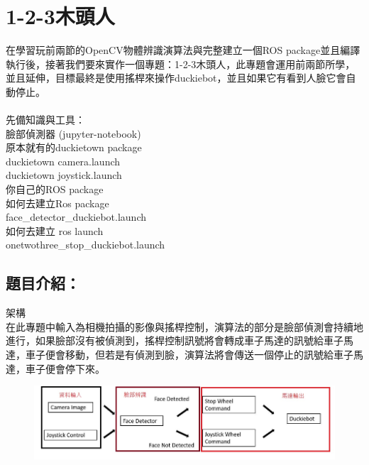\documentclass{article}
\begin{document}
\section{1-2-3木頭人}
在學習玩前兩節的OpenCV物體辨識演算法與完整建立一個ROS package並且編譯執行後，接著我們要來實作一個專題：1-2-3木頭人，此專題會運用前兩節所學，並且延伸，目標最終是使用搖桿來操作duckiebot，並且如果它有看到人臉它會自動停止。
\\\\先備知識與工具：
\\臉部偵測器 (jupyter-notebook)
\\原本就有的duckietown package
\\	duckietown camera.launch
\\	duckietown joystick.launch
\\你自己的ROS package
\\如何去建立Ros package 
\\	face\_detector\_duckiebot.launch
\\如何去建立 ros launch
\\	onetwothree\_stop\_duckiebot.launch
\subsection{題目介紹：}
架構
\\在此專題中輸入為相機拍攝的影像與搖桿控制，演算法的部分是臉部偵測會持續地進行，如果臉部沒有被偵測到，搖桿控制訊號將會轉成車子馬達的訊號給車子馬達，車子便會移動，但若是有偵測到臉，演算法將會傳送一個停止的訊號給車子馬達，車子便會停下來。
\begin{figure}[htp]
    \begin{center}
        \includegraphics[width=400pt]{pic/5_3_1.png}
    \end{center}
\end{figure}
\\
\end{document}
